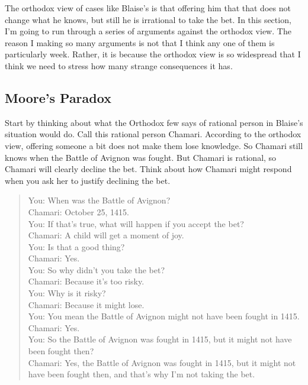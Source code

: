 \documentclass[11pt,]{book}
\begin{document}
The orthodox view of cases like Blaise's is that offering him that that does not change what he knows, but still he is irrational to take the bet. In this section, I'm going to run through a series of arguments against the orthodox view. The reason I making so many arguments is not that I think any one of them is particularly week. Rather, it is because the orthodox view is so widespread that I think we need to stress how many strange consequences it has.

\hypertarget{orthodoxmoore}{%
\subsection{Moore's Paradox}\label{orthodoxmoore}}

Start by thinking about what the Orthodox few says of rational person in Blaise's situation would do. Call this rational person Chamari. According to the orthodox view, offering someone a bit does not make them lose knowledge. So Chamari still knows when the Battle of Avignon was fought. But Chamari is rational, so Chamari will clearly decline the bet. Think about how Chamari might respond when you ask her to justify declining the bet.

\begin{quote}
You: When was the Battle of Avignon?\\
Chamari: October 25, 1415.\\
You: If that's true, what will happen if you accept the bet?\\
Chamari: A child will get a moment of joy.\\
You: Is that a good thing?\\
Chamari: Yes.\\
You: So why didn't you take the bet?\\
Chamari: Because it's too risky.\\
You: Why is it risky?\\
Chamari: Because it might lose.\\
You: You mean the Battle of Avignon might not have been fought in 1415.\\
Chamari: Yes.\\
You: So the Battle of Avignon was fought in 1415, but it might not have been fought then?\\
Chamari: Yes, the Battle of Avignon was fought in 1415, but it might not have been fought then, and that's why I'm not taking the bet.
\end{quote}
\end{document}
